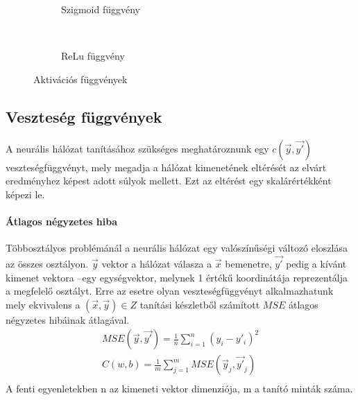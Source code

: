 \begin{figure}[h]
	\centering
	\begin{subfigure}[b]{0.3\textwidth}
		\def\svgwidth{0.5\columnwidth}
		
		\caption{Szigmoid függvény}
		\label{fig:sigmoid}
	\end{subfigure}
	~
	\begin{subfigure}[b]{0.3\textwidth}
		\def\svgwidth{0.5\columnwidth}
		
		\caption{ReLu függvény}
	\end{subfigure}
	\caption{Aktivációs függvények }
\end{figure}

\subsection{Veszteség függvények}
A neurális hálózat tanításához szükséges meghatároznunk egy $c(\vec{y},\vec{y'})$ veszteségfüggvényt, mely megadja a hálózat kimenetének eltérését az elvárt eredményhez képest adott súlyok mellett. Ezt az eltérést egy skalárértékként képezi le.

\paragraph[MSE]{Átlagos négyzetes hiba}
Többosztályos problémánál a neurális hálózat egy valószínűségi változó eloszlása az összes osztályon. $\vec{y}$ vektor a hálózat válasza a $\vec{x}$ bemenetre, $\vec{y'}$ pedig a kívánt kimenet vektora --egy egységvektor, melynek 1 értékű koordinátája reprezentálja a megfelelő osztályt. Erre az esetre olyan veszteségfüggvényt alkalmazhatunk mely ekvivalens a $(\vec{x},\vec{y})\in Z$ tanítási készletből számított $MSE$ átlagos négyzetes hibáinak átlagával.
\begin{align*}
	MSE(\vec{y},\vec{y'}) = \frac{1}{n}\sum_{i=1}^{n} (y_i - y'_i)^2\\
	C(w,b) = \frac{1}{m}\sum_{j=1}^{m} MSE(\vec{y}_j,\vec{y'}_j)\\
\end{align*}
A fenti egyenletekben n az kimeneti vektor dimenziója, m a tanító minták száma.

